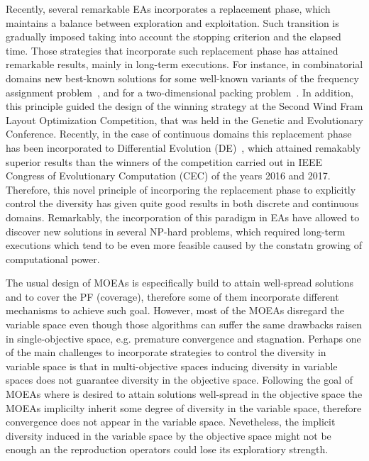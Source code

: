 Recently, several remarkable EAs incorporates a replacement phase, which maintains a balance between exploration and exploitation.
%
Such transition is gradually imposed taking into account the stopping criterion and the elapsed time.
%
Those strategies that incorporate such replacement phase has attained remarkable results, mainly in long-term executions.
%
For instance, in combinatorial domains new best-known solutions for some well-known variants of the frequency assignment problem~\cite{segura2016improving}, and for a two-dimensional packing problem~\cite{de2010optimisation}.
%
In addition, this principle guided the design of the winning strategy at the Second Wind Fram Layout Optimization Competition, that was held in the Genetic and Evolutionary Conference.
%
Recently, in the case of continuous domains this replacement phase has been incorporated to Differential Evolution (DE)~\cite{castillo2019differential}, which attained remakably superior results than the winners of the competition carried out in IEEE Congress of Evolutionary Computation (CEC) of the years 2016 and 2017.
%
Therefore, this novel principle of incorporing the replacement phase to explicitly control the diversity has given quite good results in both discrete and continuous domains.
%
Remarkably, the incorporation of this paradigm in EAs have allowed to discover new solutions in several NP-hard problems, which required long-term executions which tend to be even more feasible caused by the constatn growing of computational power.
%

The usual design of MOEAs is especifically build to attain well-spread solutions and to cover the PF (coverage), therefore some of them incorporate different mechanisms to achieve such goal.
%
However, most of the MOEAs disregard the variable space even though those algorithms can suffer the same drawbacks raisen in single-objective space, e.g. premature convergence and stagnation.
%
Perhaps one of the main challenges to incorporate strategies to control the diversity in variable space is that in multi-objective spaces inducing diversity in variable spaces does not guarantee diversity in the objective space.
%
Following the goal of MOEAs where is desired to attain solutions well-spread in the objective space the MOEAs implicilty inherit some degree of diversity in the variable space, therefore convergence does not appear in the variable space.
%
Nevetheless, the implicit diversity induced in the variable space by the objective space might not be enough an the reproduction operators could lose its exploratiory strength.
%

